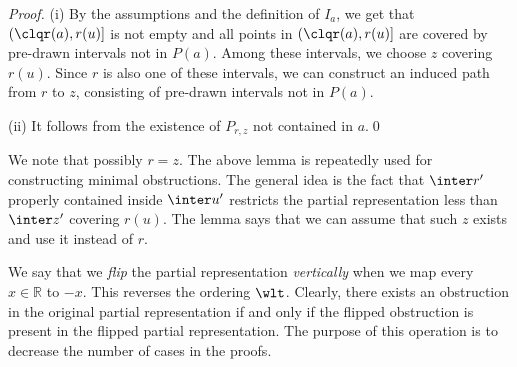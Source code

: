 \begin{proof}
(i) By the assumptions and the definition of $I_a$, we get that $(\clqr(a),r(u)]$ is not empty and
all points in $(\clqr(a),r(u)]$ are covered by pre-drawn intervals not in $P(a)$. Among these
intervals, we choose $z$ covering $r(u)$. Since $r$ is also one of these intervals, we can construct
an induced path from $r$ to $z$, consisting of pre-drawn intervals not in $P(a)$.

(ii) It follows from the existence of $P_{r,z}$ not contained in $a$.\qed
\end{proof}

We note that possibly $r = z$. The above lemma is repeatedly used for constructing minimal
obstructions. The general idea is the fact that $\inter r'$ properly contained inside $\inter u'$
restricts the partial representation less than $\inter z'$ covering $r(u)$. The lemma
says that we can assume that such $z$ exists and use it instead of $r$.

 We say that we \emph{flip} the partial representation \emph{vertically}
when we map every $x \in \mathbb R$ to $-x$. This reverses the ordering $\wlt$.  Clearly, there
exists an obstruction in the original partial representation if and only if the flipped obstruction
is present in the flipped partial representation. The purpose of this operation is to decrease the
number of cases in the proofs.
